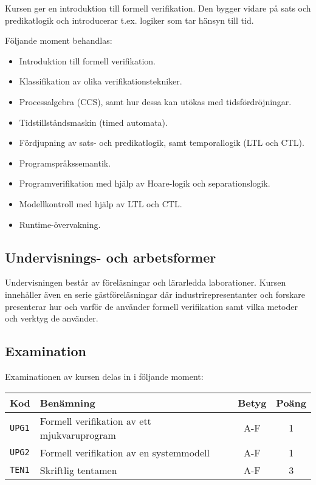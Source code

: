 Kursen ger en introduktion till formell verifikation. Den bygger vidare
på sats och predikatlogik och introducerar t.ex. logiker som tar hänsyn
till tid.

Följande moment behandlas:

\begin{itemize}
\tightlist
\item
  Introduktion till formell verifikation.
\item
  Klassifikation av olika verifikationstekniker.
\item
  Processalgebra (CCS), samt hur dessa kan utökas med tidsfördröjningar.
\item
  Tidstillståndsmaskin (timed automata).
\item
  Fördjupning av sats- och predikatlogik, samt temporallogik (LTL och
  CTL).
\item
  Programspråkssemantik.
\item
  Programverifikation med hjälp av Hoare-logik och separationslogik.
\item
  Modellkontroll med hjälp av LTL och CTL.
\item
  Runtime-övervakning.
\end{itemize}

\subsection*{Undervisnings- och
arbetsformer}

Undervisningen består av föreläsningar och lärarledda laborationer.
Kursen innehåller även en serie gästföreläsningar där
industrirepresentanter och forskare presenterar hur och varför de
använder formell verifikation samt vilka metoder och verktyg de
använder.

\subsection*{Examination}

Examinationen av kursen delas in i följande moment:

\begin{longtable}[]{@{}llcc@{}}
\toprule
\textsf{Kod} & \textsf{Benämning} & \textsf{Betyg} & \textsf{Poäng}\tabularnewline
\midrule
\endhead
\texttt{UPG1} & Formell verifikation av ett mjukvaruprogram & A-F &
1\tabularnewline
\texttt{UPG2} & Formell verifikation av en systemmodell & A-F & 1\tabularnewline
\texttt{TEN1} & Skriftlig tentamen & A-F & 3\tabularnewline
\bottomrule
\end{longtable}

